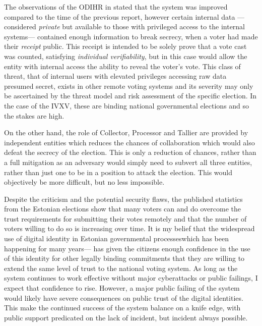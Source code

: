 The observations of the ODIHR in \cite{OSCEODIHRElection2019} stated that the system was improved compared to the time of the previous report, however certain internal data ---considered \emph{private} but available to those with privileged access to the internal systems--- contained enough information to break secrecy, when a voter had made their \emph{receipt} public. This receipt is intended to be solely prove that a vote cast was counted, satisfying \emph{individual verifiability}, but in this case would allow the entity with internal access the ability to reveal the voter's vote. This class of threat, that of internal users with elevated privileges accessing raw data presumed secret, exists in other remote voting systems and its severity may only be ascertained by the threat model and risk assessment of the specific election. In the case of the IVXV, these are binding national governmental elections and so the stakes are high.

On the other hand, the role of Collector, Processor and Tallier are provided by independent entities which reduces the chances of collaboration which would also defeat the secrecy of the election. This is only a reduction of chances, rather than a full mitigation as an adversary would simply need to subvert all three entities, rather than just one to be in a position to attack the election. This would objectively be more difficult, but no less impossible.


Despite the criticism and the potential security flaws, the published statistics from the Estonian elections show that many voters can and do overcome the trust requirements for submitting their votes remotely and that the number of voters willing to do so is increasing over time. It is my belief that the widespread use of digital identity in Estonian governmental processeswhich has been happening for many years--- has given the citizens enough confidence in the use of this identity for other legally binding commitments that they are willing to extend the same level of trust to the national voting system. As long as the system continues to work effective without major cyberattacks or public failings, I expect that confidence to rise. However, a major public failing of the system would likely have severe consequences on public trust of the digital identities. This make the continued success of the system balance on a knife edge, with public support predicated on the lack of incident, but incident always possible.


